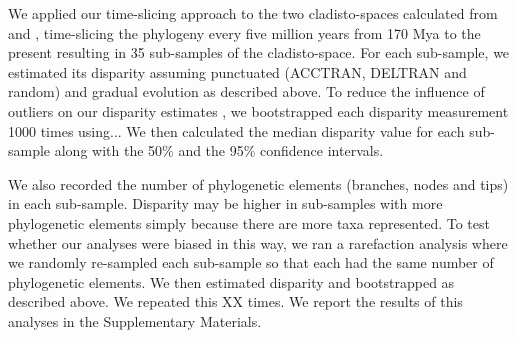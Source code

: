 \documentclass[12pt,letterpaper]{article}
\begin{document}

We applied our time-slicing approach to the two cladisto-spaces calculated from \cite{Slater2012MEE} and \cite{beckancient2014}, time-slicing the phylogeny every five million years from 170 Mya to the present resulting in 35 sub-samples of the cladisto-space.
For each sub-sample, we estimated its disparity assuming punctuated (ACCTRAN, DELTRAN and random) and gradual evolution as described above.
To reduce the influence of outliers on our disparity estimates %
, we bootstrapped each disparity measurement 1000 times using...  %
We then calculated the median disparity value for each sub-sample along with the 50\% and the 95\% confidence intervals.

We also recorded 
the number of phylogenetic elements (branches, nodes and tips) in each sub-sample.
Disparity may be higher in sub-samples with more phylogenetic elements simply because there are more taxa represented. To test whether our analyses were biased in this way, we ran a rarefaction analysis where we randomly re-sampled each sub-sample so that each had the same number of phylogenetic elements. We then estimated disparity and bootstrapped as described above. We repeated this XX times. %
We report the results of this analyses in the Supplementary Materials. %
\end{document}
